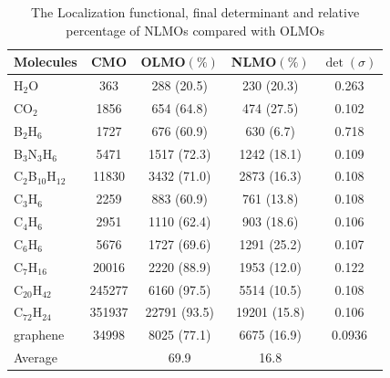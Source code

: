 \documentclass[aps,prl,reprint,amsmath,amssymb]{revtex4-1}
\begin{document}
\begin{table}[tb]
\caption{The Localization functional, final determinant and relative percentage of NLMOs compared with OLMOs}
\label{tab:loc}
\centering
\begin{tabular}{l c c c c}
\hline\hline
Molecules & CMO &  OLMO$(\%)$ & NLMO$(\%)$ & $\det(\sigma)$ \\
\hline
H$_2$O & 363 & 288 (20.5) & 230 (20.3) & 0.263 \\ 
CO$_2$ & 1856 & 654 (64.8) & 474 (27.5) & 0.102 \\
B$_2$H$_6$ & 1727 & 676 (60.9) & 630 (6.7) & 0.718 \\
B$_3$N$_3$H$_6$ & 5471 & 1517 (72.3)  & 1242 (18.1) & 0.109  \\
C$_2$B$_{10}$H$_{12}$ & 11830 & 3432 (71.0) & 2873 (16.3) & 0.108 \\ 
C$_3$H$_6$ & 2259 & 883 (60.9) & 761 (13.8) & 0.108 \\
C$_4$H$_6$ & 2951 & 1110 (62.4) & 903 (18.6) & 0.106 \\
C$_6$H$_6$  & 5676 & 1727 (69.6) & 1291 (25.2) & 0.107 \\ 
C$_7$H$_{16}$ & 20016 & 2220 (88.9) & 1953 (12.0) & 0.122 \\ 
C$_{20}$H$_{42}$ & 245277 & 6160 (97.5) & 5514 (10.5) & 0.108 \\ 
C$_{72}$H$_{24}$ & 351937 & 22791 (93.5) & 19201 (15.8) & 0.106 \\ 
graphene & 34998 & 8025 (77.1) & 6675 (16.9) & 0.0936 \\
Average & & 69.9 & 16.8 & \\
\hline
\end{tabular}
\label{table:nonlin}
\end{table}

\end{document}
